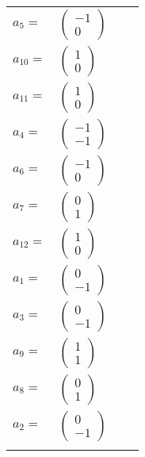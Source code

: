 \documentclass[1p]{elsarticle_modified}
\theoremstyle{definition}
\begin{document}
\begin{tabular}{m{7pt} m{180pt} m{7pt} m{180pt} }
\flushright $a_{5}=$&$\begin{pmatrix}-1\\0\end{pmatrix}$ \\
\flushright $a_{10}=$&$\begin{pmatrix}1\\0\end{pmatrix}$ \\
\flushright $a_{11}=$&$\begin{pmatrix}1\\0\end{pmatrix}$ \\
\flushright $a_{4}=$&$\begin{pmatrix}-1\\-1\end{pmatrix}$ \\
\flushright $a_{6}=$&$\begin{pmatrix}-1\\0\end{pmatrix}$ \\
\flushright $a_{7}=$&$\begin{pmatrix}0\\1\end{pmatrix}$ \\
\flushright $a_{12}=$&$\begin{pmatrix}1\\0\end{pmatrix}$ \\
\flushright $a_{1}=$&$\begin{pmatrix}0\\-1\end{pmatrix}$ \\
\flushright $a_{3}=$&$\begin{pmatrix}0\\-1\end{pmatrix}$ \\
\flushright $a_{9}=$&$\begin{pmatrix}1\\1\end{pmatrix}$ \\
\flushright $a_{8}=$&$\begin{pmatrix}0\\1\end{pmatrix}$ \\
\flushright $a_{2}=$&$\begin{pmatrix}0\\-1\end{pmatrix}$\\&\end{tabular}
\end{document}
